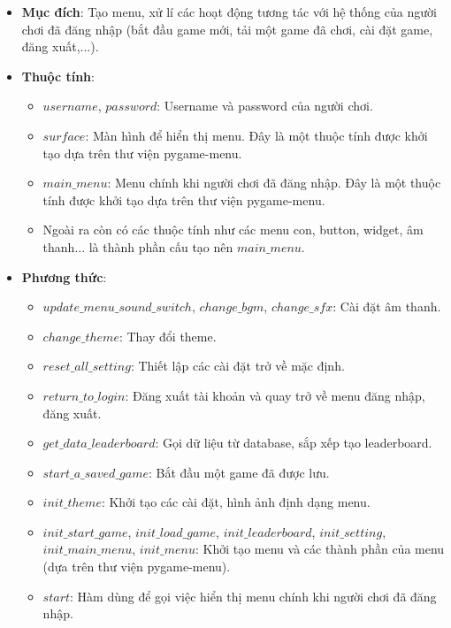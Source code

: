 \begin{itemize}
    \item \textbf{Mục đích}: Tạo menu, xử lí các hoạt động tương tác với hệ thống của người chơi đã đăng nhập (bắt đầu game mới, tải một game đã chơi, cài đặt game, đăng xuất,...).
    \item \textbf{Thuộc tính}:
    
    \begin{itemize}
        \item $username$, $password$: Username và password của người chơi.
        \item $surface$: Màn hình để hiển thị menu. Đây là một thuộc tính được khởi tạo dựa trên thư viện pygame-menu.
        \item $main\_menu$: Menu chính khi người chơi đã đăng nhập. Đây là một thuộc tính được khởi tạo dựa trên thư viện pygame-menu.
        \item Ngoài ra còn có các thuộc tính như các menu con, button, widget, âm thanh... là thành phần cấu tạo nên $main\_menu$.
    \end{itemize}
    
    \item \textbf{Phương thức}:

    \begin{itemize}
        \item $update\_menu\_sound\_switch$, $change\_bgm$, $change\_sfx$: Cài đặt âm thanh.
        \item $change\_theme$: Thay đổi theme.
        \item $reset\_all\_setting$: Thiết lập các cài đặt trở về mặc định.
        \item $return\_to\_login$: Đăng xuất tài khoản và quay trở về menu đăng nhập, đăng xuất.
        \item $get\_data\_leaderboard$: Gọi dữ liệu từ database, sắp xếp tạo leaderboard.
        \item $start\_a\_saved\_game$: Bắt đầu một game đã được lưu.
        \item $init\_theme$: Khởi tạo các cài đặt, hình ảnh định dạng menu.
        \item $init\_start\_game$, $init\_load\_game$, $init\_leaderboard$, $init\_setting$, $init\_main\_menu$, $init\_menu$: Khởi tạo menu và các thành phần của menu (dựa trên thư viện pygame-menu).
        \item $start$: Hàm dùng để gọi việc hiển thị menu chính khi người chơi đã đăng nhập.
    \end{itemize}
    
\end{itemize}

